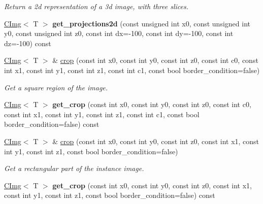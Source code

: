 \begin{DoxyCompactItemize}
\begin{DoxyCompactList}\small\item\em Return a 2d representation of a 3d image, with three slices. \item\end{DoxyCompactList}\item 
\hypertarget{structcimg__library_1_1CImg_ae4e42b0c1cb1f4ed377e9048e4ab463c}{
\hyperlink{structcimg__library_1_1CImg}{CImg}$<$ T $>$ {\bfseries get\_\-projections2d} (const unsigned int x0, const unsigned int y0, const unsigned int z0, const int dx=-\/100, const int dy=-\/100, const int dz=-\/100) const }
\label{structcimg__library_1_1CImg_ae4e42b0c1cb1f4ed377e9048e4ab463c}

\item 
\hyperlink{structcimg__library_1_1CImg}{CImg}$<$ T $>$ \& \hyperlink{structcimg__library_1_1CImg_a0c93696264da300b4673dfe67683ecfd}{crop} (const int x0, const int y0, const int z0, const int c0, const int x1, const int y1, const int z1, const int c1, const bool border\_\-condition=false)
\begin{DoxyCompactList}\small\item\em Get a square region of the image. \item\end{DoxyCompactList}\item 
\hypertarget{structcimg__library_1_1CImg_a9498222bbaa84f26c4b40d414c651c2d}{
\hyperlink{structcimg__library_1_1CImg}{CImg}$<$ T $>$ {\bfseries get\_\-crop} (const int x0, const int y0, const int z0, const int c0, const int x1, const int y1, const int z1, const int c1, const bool border\_\-condition=false) const }
\label{structcimg__library_1_1CImg_a9498222bbaa84f26c4b40d414c651c2d}

\item 
\hyperlink{structcimg__library_1_1CImg}{CImg}$<$ T $>$ \& \hyperlink{structcimg__library_1_1CImg_a0a1400f592a7192b1e6421f5d7045d6a}{crop} (const int x0, const int y0, const int z0, const int x1, const int y1, const int z1, const bool border\_\-condition=false)
\begin{DoxyCompactList}\small\item\em Get a rectangular part of the instance image. \item\end{DoxyCompactList}\item 
\hypertarget{structcimg__library_1_1CImg_a9aee13f0b800292841931e93d5941850}{
\hyperlink{structcimg__library_1_1CImg}{CImg}$<$ T $>$ {\bfseries get\_\-crop} (const int x0, const int y0, const int z0, const int x1, const int y1, const int z1, const bool border\_\-condition=false) const }
\label{structcimg__library_1_1CImg_a9aee13f0b800292841931e93d5941850}


\end{DoxyCompactItemize}
